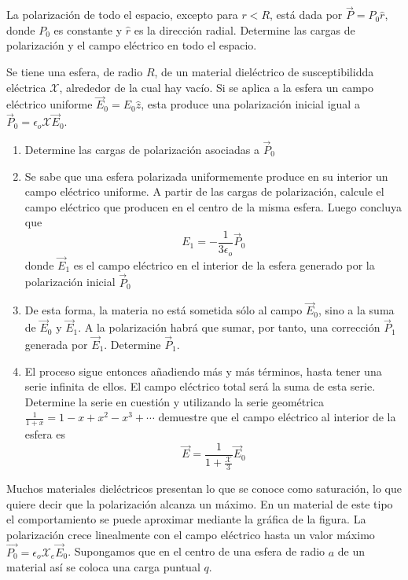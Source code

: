 \bigbreak
\np

La polarización de todo el espacio, excepto para $r < R$, está dada por $\Vec{P} = P_0\hat{r}$, donde $P_0$ es constante y $\hat{r}$ es la dirección radial. Determine las cargas de polarización y el campo eléctrico en todo el espacio.

\bigbreak

\np%

Se tiene una esfera, de radio $R$, de un material
dieléctrico de susceptibilidda eléctrica $\mathcal{X}$, alrededor de la cual hay vacío. Si se aplica a la esfera un campo eléctrico uniforme $\Vec{E}_0 = E_0\hat{z}$, esta produce una polarización inicial igual a $\Vec{P}_0 = \epsilon_o\mathcal{X}\Vec{E}_0$.

\begin{enumerate}[label=\alph*)]
    \item Determine las cargas de polarización asociadas a $\Vec{P}_0$
    \item Se sabe que una esfera polarizada uniformemente produce en su interior un campo eléctrico uniforme. A partir de las cargas de polarización, calcule el campo eléctrico que producen en el centro de la misma esfera. Luego concluya que
    \[E_1 = -\frac{1}{3\epsilon_o}\Vec{P}_0\]
    donde $\Vec{E}_1$ es el campo eléctrico en el interior de la esfera generado por la polarización inicial $\Vec{P}_0$
    \item De esta forma, la materia no está sometida sólo al campo $\Vec{E}_0$, sino a la suma de $\Vec{E}_0$ y $\Vec{E}_1$. A la polarización habrá que sumar, por tanto, una corrección $\Vec{P}_1$ generada por $\Vec{E}_1$. Determine $\Vec{P}_1$.
    \item El proceso sigue entonces añadiendo más y más términos, hasta tener una serie infinita de ellos. El campo eléctrico total será la suma de esta serie. Determine la serie en cuestión y utilizando la serie geométrica $\frac{1}{1+x} = 1 - x + x^2 - x^3 + \cdots$ demuestre que el campo eléctrico al interior de la esfera es
    \[\Vec{E}=\frac{1}{1+\frac{\mathcal{X}}{3}}\Vec{E}_0\]
\end{enumerate}


\np

Muchos materiales dieléctricos presentan lo que se conoce como saturación, lo que quiere decir que la polarización alcanza un máximo. En un material de este tipo el comportamiento se puede aproximar mediante la gráfica de la figura. La polarización crece linealmente con el campo eléctrico hasta un valor máximo $\Vec{P_0}=\epsilon_o\mathcal{X}_e\Vec{E}_0$. Supongamos que en el centro de una esfera de radio $a$ de un material así se coloca una carga puntual $q$.


